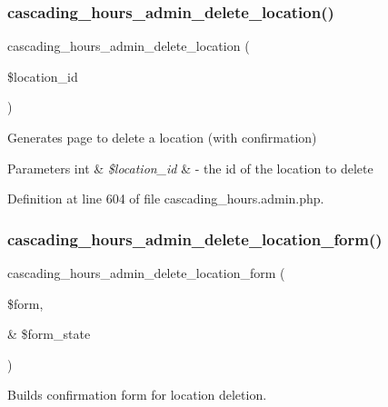 \subsubsection{\texorpdfstring{cascading\+\_\+hours\+\_\+admin\+\_\+delete\+\_\+location()}{cascading\_hours\_admin\_delete\_location()}}
{\footnotesize\ttfamily cascading\+\_\+hours\+\_\+admin\+\_\+delete\+\_\+location (\begin{DoxyParamCaption}\item[{}]{\$location\+\_\+id }\end{DoxyParamCaption})}



Generates page to delete a location (with confirmation) 


\begin{DoxyParams}[1]{Parameters}
int & {\em \$location\+\_\+id} & -\/ the id of the location to delete \\
\hline
\end{DoxyParams}


Definition at line 604 of file cascading\+\_\+hours.\+admin.\+php.

\mbox{\label{cascading__hours_8admin_8php_a0c55391c2ef3dedd13b15f979d3340ad_a0c55391c2ef3dedd13b15f979d3340ad}} 
\subsubsection{\texorpdfstring{cascading\+\_\+hours\+\_\+admin\+\_\+delete\+\_\+location\+\_\+form()}{cascading\_hours\_admin\_delete\_location\_form()}}
{\footnotesize\ttfamily cascading\+\_\+hours\+\_\+admin\+\_\+delete\+\_\+location\+\_\+form (\begin{DoxyParamCaption}\item[{}]{\$form,  }\item[{\&}]{\$form\+\_\+state }\end{DoxyParamCaption})}



Builds confirmation form for location deletion. 


